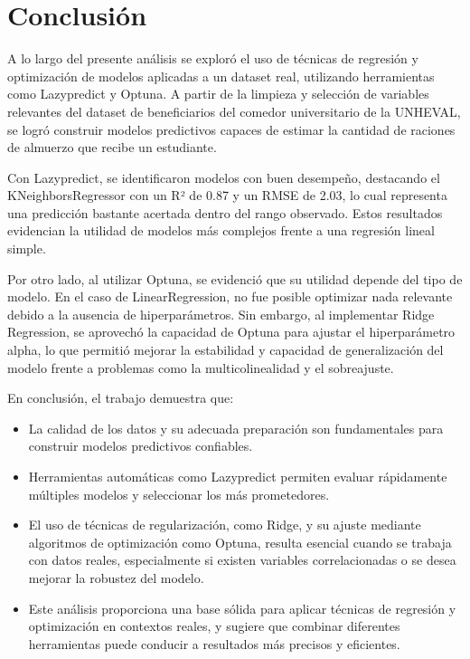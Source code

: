 \documentclass{article}
\begin{document}
\section{Conclusión}

A lo largo del presente análisis se exploró el uso de técnicas de regresión y optimización de modelos aplicadas a un dataset real, utilizando herramientas como Lazypredict y Optuna. A partir de la limpieza y selección de variables relevantes del dataset de beneficiarios del comedor universitario de la UNHEVAL, se logró construir modelos predictivos capaces de estimar la cantidad de raciones de almuerzo que recibe un estudiante.

Con Lazypredict, se identificaron modelos con buen desempeño, destacando el KNeighborsRegressor con un R² de 0.87 y un RMSE de 2.03, lo cual representa una predicción bastante acertada dentro del rango observado. Estos resultados evidencian la utilidad de modelos más complejos frente a una regresión lineal simple.

Por otro lado, al utilizar Optuna, se evidenció que su utilidad depende del tipo de modelo. En el caso de LinearRegression, no fue posible optimizar nada relevante debido a la ausencia de hiperparámetros. Sin embargo, al implementar Ridge Regression, se aprovechó la capacidad de Optuna para ajustar el hiperparámetro alpha, lo que permitió mejorar la estabilidad y capacidad de generalización del modelo frente a problemas como la multicolinealidad y el sobreajuste.

En conclusión, el trabajo demuestra que:
\begin{itemize}
    \item La calidad de los datos y su adecuada preparación son fundamentales para construir modelos predictivos confiables.
    \item Herramientas automáticas como Lazypredict permiten evaluar rápidamente múltiples modelos y seleccionar los más prometedores.
    \item El uso de técnicas de regularización, como Ridge, y su ajuste mediante algoritmos de optimización como Optuna, resulta esencial cuando se trabaja con datos reales, especialmente si existen variables correlacionadas o se desea mejorar la robustez del modelo.
    \item Este análisis proporciona una base sólida para aplicar técnicas de regresión y optimización en contextos reales, y sugiere que combinar diferentes herramientas puede conducir a resultados más precisos y eficientes.


\end{itemize}
\end{document}
